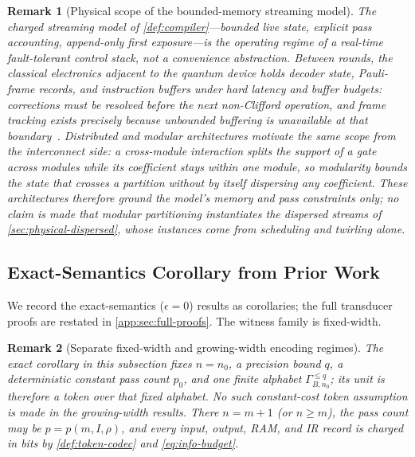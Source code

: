 \documentclass[aps,prx,reprint,floatfix,superscriptaddress]{revtex4-2}
\newtheorem{remark}{Remark}
\begin{document}
\begin{remark}[Physical scope of the bounded-memory streaming model]
\label{rem:streaming-grounding}
The charged streaming model of \cref{def:compiler}---bounded live
state, explicit pass accounting, append-only first exposure---is the
operating regime of a real-time fault-tolerant control stack, not a
convenience abstraction.  Between rounds, the classical electronics
adjacent to the quantum device holds decoder state, Pauli-frame
records, and instruction buffers under hard latency and buffer
budgets: corrections must be resolved before the next non-Clifford
operation, and frame tracking exists precisely because unbounded
buffering is unavailable at that
boundary~\cite{riesebos2017pauli,watkins2024surfacecode}.  Distributed
and modular architectures motivate the same scope from the
interconnect side: a cross-module interaction splits the
\emph{support} of a gate across modules while its coefficient stays
within one module, so modularity bounds the state that crosses a
partition without by itself dispersing any coefficient.  These
architectures therefore ground the model's memory and pass
constraints only; no claim is made that modular partitioning
instantiates the dispersed streams of \cref{sec:physical-dispersed},
whose instances come from scheduling and twirling alone.
\end{remark}

\subsection{Exact-Semantics Corollary from Prior Work}

We record the exact-semantics ($\epsilon = 0$) results
as corollaries; the full transducer proofs are
restated in \cref{app:sec:full-proofs}. The witness family is
fixed-width.

\begin{remark}[Separate fixed-width and growing-width encoding regimes]
\label{rem:encoding-regimes}
The exact corollary in this subsection fixes $n=n_0$, a precision bound
$q$, a deterministic constant pass count $p_0$, and one finite alphabet
$\Gamma_{B,n_0}^{\leq q}$; its unit is therefore a token over that fixed
alphabet.  No such constant-cost token assumption is made in the
growing-width results.  There $n=m+1$ (or $n\geq m$), the pass count may be
$p=p(m,I,\rho)$, and every input, output, RAM, and IR record is charged in
bits by \cref{def:token-codec} and \eqref{eq:info-budget}.
\end{remark}
\end{document}
